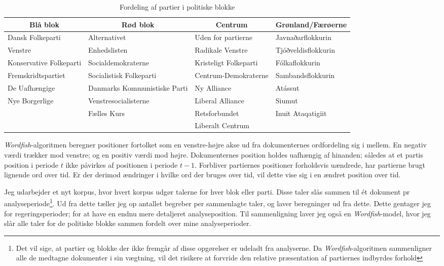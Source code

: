 \begin{table}
\caption{Fordeling af partier i politiske blokke}
\label{tab:party2bloc}
\begin{adjustwidth}{-0.6in}{-0.6in}
\begin{tabular}{@{}llll@{}}
\multicolumn{1}{c}{\textbf{Blå blok}} & \multicolumn{1}{c}{\textbf{Rød blok}} & \multicolumn{1}{c}{\textbf{Centrum}} & \multicolumn{1}{c}{\textbf{Grønland/Færøerne}} \\ \midrule
Dansk Folkeparti    & Alternativet         & Uden for partierne  & Javnaðarflokkurin              \\
Venstre         & Enhedslisten         & Radikale Venstre   & Tjóðveldisflokkurin             \\
Konservative Folkeparti & Socialdemokraterne      & Kristeligt Folkeparti & Fólkaflokkurin               \\
Fremskridtspartiet   & Socialistisk Folkeparti    & Centrum-Demokraterne & Sambandsflokkurin              \\
De Uafhængige      & Danmarks Kommunistiske Parti & Ny Alliance      & Atássut                   \\
Nye Borgerlige     & Venstresocialisterne     & Liberal Alliance   & Siumut                   \\
            & Fælles Kurs          & Retsforbundet     & Inuit Ataqatigiit              \\
            & & Liberalt Centrum      &                        \\ \bottomrule
\end{tabular}
\end{adjustwidth}
\end{table}

\textit{Wordfish}-algoritmen beregner positioner fortolket som en venstre-højre akse ud fra dokumenternes ordfordeling sig i mellem.
En negativ værdi trækker mod venstre; og en positiv værdi mod højre.
Dokumenternes position holdes uafhængig af hinanden; således at et partis position i periode $t$ ikke påvirkes af positionen i periode $t-1$.
Forbliver partiernes positioner forholdsvis uændrede, har partierne brugt lignende ord over tid.
Er der derimod ændringer i hvilke ord der bruges over tid, vil dette vise sig i en ændret position over tid.

Jeg udarbejder et nyt korpus, hvor hvert korpus udgør talerne for hver blok eller parti.
Disse taler slås sammen til ét dokument pr analyseperiode\footnote{
Det vil sige, at partier og blokke der ikke fremgår af disse opgørelser er udeladt fra analyserne.
Da \textit{Wordfish}-algoritmen sammenligner alle de medtagne dokumenter i sin vægtning, vil det risikere at forvride den relative præsentation af partiernes indbyrdes forhold}.
Ud fra dette tæller jeg op antallet begreber per sammenlagte taler, og laver beregninger ud fra dette.
Dette gentager jeg for regeringsperioder; for at have en endnu mere detaljeret analyseposition.
Til sammenligning laver jeg også en \textit{Wordfish}-model, hvor jeg slår alle taler for de politiske blokke sammen fordelt over mine analyseperioder.

